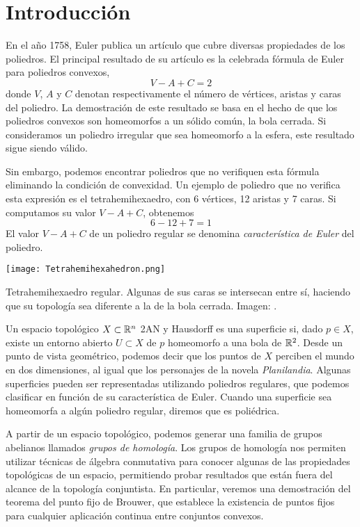 \chapter*{Introducción}
En el año 1758, Euler publica un artículo que cubre diversas propiedades de los poliedros.
El principal resultado de su artículo es la celebrada fórmula de Euler para poliedros convexos,
	\[V-A+C=2\]
donde $V$, $A$ y $C$ denotan respectivamente el número de vértices, aristas y caras del poliedro.
La demostración de este resultado se basa en el hecho de que los poliedros convexos son homeomorfos a un sólido común, la bola cerrada.
Si consideramos un poliedro irregular que sea homeomorfo a la esfera, este resultado sigue siendo válido.

Sin embargo, podemos encontrar poliedros que no verifiquen esta fórmula eliminando la condición de convexidad.
Un ejemplo de poliedro que no verifica esta expresión es el tetrahemihexaedro, con 6 vértices, 12 aristas y 7 caras.
Si computamos su valor $V-A+C$, obtenemos
	\[6-12+7=1\]
El valor $V-A+C$ de un poliedro regular se denomina \emph{característica de Euler} del poliedro.

\begin{marginfigure}
\texttt{[image: Tetrahemihexahedron.png]}
	\caption[Tetrahemihexaedro]{Tetrahemihexaedro regular.
	Algunas de sus caras se intersecan entre sí, haciendo que su topología sea diferente a la de la bola cerrada.
	Imagen: \cite{Tetra}.}
\end{marginfigure}

Un espacio topológico $X \subset \mathbb{R}^n$ 2AN y Hausdorff es una superficie si, dado $p \in X$, existe un entorno abierto $U \subset X$ de $p$ homeomorfo a una bola de $\mathbb{R}^2$.
Desde un punto de vista geométrico, podemos decir que los puntos de $X$ perciben el mundo en dos dimensiones, al igual que los personajes de la novela \emph{Planilandia}.
Algunas superficies pueden ser representadas utilizando poliedros regulares, que podemos clasificar en función de su característica de Euler.
Cuando una superficie sea homeomorfa a algún poliedro regular, diremos que es poliédrica.

A partir de un espacio topológico, podemos generar una familia de grupos abelianos llamados \emph{grupos de homología}.
Los grupos de homología nos permiten utilizar técnicas de álgebra conmutativa para conocer algunas de las propiedades topológicas de un espacio, permitiendo probar resultados que están fuera del alcance de la topología conjuntista.
En particular, veremos una demostración del teorema del punto fijo de Brouwer, que establece la existencia de puntos fijos para cualquier aplicación continua entre conjuntos convexos.

